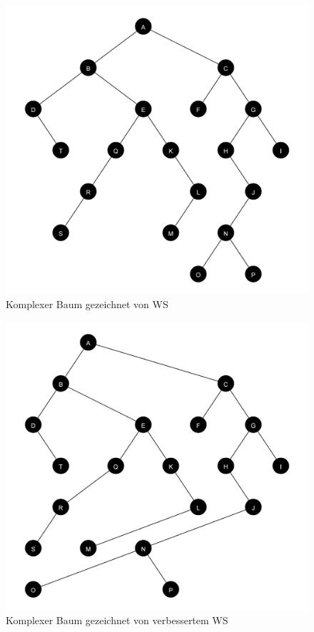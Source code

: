 \begin{figure}[ht]
    \centering
    \includegraphics[scale = 0.12]{abbildungen/komplex_a2}
    \caption{Komplexer Baum gezeichnet von \ac{WS}}
    \label{pic:komplex_a2}
\end{figure}

\begin{figure}[ht]
    \centering
    \includegraphics[scale = 0.12]{abbildungen/komplex_a2_v}
    \caption{Komplexer Baum gezeichnet von verbessertem \ac{WS}}
    \label{pic:komplex_a2v}
\end{figure}

